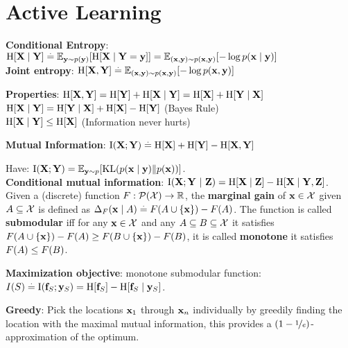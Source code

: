 \section{Active Learning}
\begin{framed}
    \textbf{Conditional Entropy}: $\H{\rX \mid \rY} \defeq \E[\vy \sim p(\vy)]{\H{\rX \mid \rY = \vy}} \\= \E[(\vx, \vy) \sim p(\vx, \vy)]{- \log p(\vx \mid \vy)}$ \\
    \textbf{Joint entropy}: $\H{\rX, \rY} \defeq \E[(\vx, \vy) \sim p(\vx, \vy)]{- \log p(\vx, \vy)}$ 
    \vspace{1mm}
\end{framed}
\begin{framed}
    \textbf{Properties}: $\H{\rX, \rY} = \H{\rY} + \H{\rX \mid \rY} = \H{\rX} + \H{\rY \mid \rX}$ \\
    $\H{\rX \mid \rY} = \H{\rY \mid \rX} + \H{\rX} - \H{\rY}$ (Bayes Rule) \\
    $\H{\rX \mid \rY} \leq \H{\rX}$ (Information never hurts)
\end{framed}
\begin{framed}
    \textbf{Mutual Information}: $\I{\rX}{\rY} \defeq \H{\rX} + \H{\rY} - \H{\rX, \rY}$
\end{framed}
Have: $\I{\rX}{\rY} = \E[\vy \sim p]{\KL{p(\vx \mid \vy)}{p(\vx)}}$. \\
\textbf{Conditional mutual information}: $\I{\rX}{\rY}[\rZ] = \H{\rX \mid \rZ} - \H{\rX \mid \rY, \rZ}$. \\
Given a (discrete) function $F : \pset{\spX} \to \R$, the \textbf{marginal gain} of $\mathbf{x} \in \mathcal{X}$ given $A \subseteq \mathcal{X}$ is defined as $\Delta_F(\mathbf{x} \mid A) \overset{.}{=} F(A \cup \{\mathbf{x}\}) - F(A)$. The function is called \textbf{submodular} iff for any $\mathbf{x} \in \mathcal{X}$ and any $A \subseteq B \subseteq \mathcal{X}$ it satisfies $F(A \cup \{\mathbf{x}\}) - F(A) \geq F(B \cup \{\mathbf{x}\}) - F(B)$, it is called \textbf{monotone} it satisfies $F(A) \leq F(B)$. \\
\begin{framed}
    \textbf{Maximization objective}: monotone submodular function: \\ $I(\sS) \defeq \I{\vf_\sS}{\vy_\sS} = \H{\vf_\sS} - \H{\vf_\sS \mid \vy_\sS}$.
\end{framed}
\textbf{Greedy}: Pick the locations $\mathbf{x}_1$ through $\mathbf{x}_n$ individually by greedily finding the location with the maximal mutual information, this provides a $(1 - \nicefrac{1}{e})$-approximation of the optimum. \\
